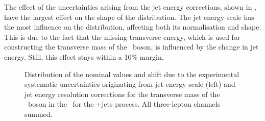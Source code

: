 \newpage
The effect of the uncertainties arising from the jet energy corrections, shown in ,  have the largest effect on the shape of the distribution. The jet energy scale has the most influence on the distribution, affecting both its normalisation and shape. This is due to the fact that the missing transverse energy, which is used for constructing the transverse mass of the \PW\ boson, is influenced by the change in jet energy. Still, this effect stays within a 10\% margin.
\begin{figure}[htbp] 
	\centering 
	\caption{Distribution of the nominal values and shift due to the experimental systematic uncertainties originating from jet energy scale (left) and jet energy resolution corrections for the transverse mass of the \PW\ boson in the \WZCR\ for the \WZ+jets process. All three-lepton channels summed.}
	\label{fig:shiftMTW3}
\end{figure}


